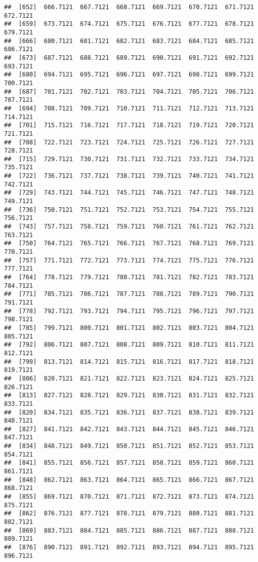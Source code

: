 \documentclass[
]{article}
\begin{document}
\begin{verbatim}
##  [652]  666.7121  667.7121  668.7121  669.7121  670.7121  671.7121  672.7121
##  [659]  673.7121  674.7121  675.7121  676.7121  677.7121  678.7121  679.7121
##  [666]  680.7121  681.7121  682.7121  683.7121  684.7121  685.7121  686.7121
##  [673]  687.7121  688.7121  689.7121  690.7121  691.7121  692.7121  693.7121
##  [680]  694.7121  695.7121  696.7121  697.7121  698.7121  699.7121  700.7121
##  [687]  701.7121  702.7121  703.7121  704.7121  705.7121  706.7121  707.7121
##  [694]  708.7121  709.7121  710.7121  711.7121  712.7121  713.7121  714.7121
##  [701]  715.7121  716.7121  717.7121  718.7121  719.7121  720.7121  721.7121
##  [708]  722.7121  723.7121  724.7121  725.7121  726.7121  727.7121  728.7121
##  [715]  729.7121  730.7121  731.7121  732.7121  733.7121  734.7121  735.7121
##  [722]  736.7121  737.7121  738.7121  739.7121  740.7121  741.7121  742.7121
##  [729]  743.7121  744.7121  745.7121  746.7121  747.7121  748.7121  749.7121
##  [736]  750.7121  751.7121  752.7121  753.7121  754.7121  755.7121  756.7121
##  [743]  757.7121  758.7121  759.7121  760.7121  761.7121  762.7121  763.7121
##  [750]  764.7121  765.7121  766.7121  767.7121  768.7121  769.7121  770.7121
##  [757]  771.7121  772.7121  773.7121  774.7121  775.7121  776.7121  777.7121
##  [764]  778.7121  779.7121  780.7121  781.7121  782.7121  783.7121  784.7121
##  [771]  785.7121  786.7121  787.7121  788.7121  789.7121  790.7121  791.7121
##  [778]  792.7121  793.7121  794.7121  795.7121  796.7121  797.7121  798.7121
##  [785]  799.7121  800.7121  801.7121  802.7121  803.7121  804.7121  805.7121
##  [792]  806.7121  807.7121  808.7121  809.7121  810.7121  811.7121  812.7121
##  [799]  813.7121  814.7121  815.7121  816.7121  817.7121  818.7121  819.7121
##  [806]  820.7121  821.7121  822.7121  823.7121  824.7121  825.7121  826.7121
##  [813]  827.7121  828.7121  829.7121  830.7121  831.7121  832.7121  833.7121
##  [820]  834.7121  835.7121  836.7121  837.7121  838.7121  839.7121  840.7121
##  [827]  841.7121  842.7121  843.7121  844.7121  845.7121  846.7121  847.7121
##  [834]  848.7121  849.7121  850.7121  851.7121  852.7121  853.7121  854.7121
##  [841]  855.7121  856.7121  857.7121  858.7121  859.7121  860.7121  861.7121
##  [848]  862.7121  863.7121  864.7121  865.7121  866.7121  867.7121  868.7121
##  [855]  869.7121  870.7121  871.7121  872.7121  873.7121  874.7121  875.7121
##  [862]  876.7121  877.7121  878.7121  879.7121  880.7121  881.7121  882.7121
##  [869]  883.7121  884.7121  885.7121  886.7121  887.7121  888.7121  889.7121
##  [876]  890.7121  891.7121  892.7121  893.7121  894.7121  895.7121  896.7121

\end{verbatim}
\end{document}
